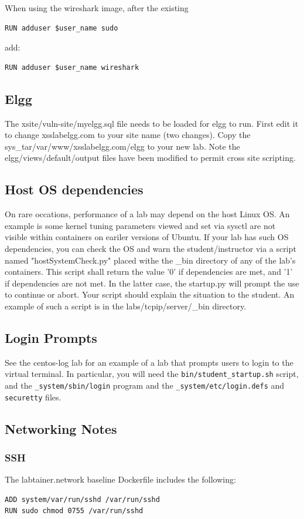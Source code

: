 \documentclass[12pt]{article}
\begin{document}
When using the wireshark image, after the existing 
\begin{verbatim}
RUN adduser $user_name sudo
\end{verbatim}

\noindent add:

\begin{verbatim}
RUN adduser $user_name wireshark
\end{verbatim}

\subsection{Elgg}
The xsite/vuln-site/myelgg.sql file needs to be loaded for elgg to run.  First edit it to
change xsslabelgg.com to your site name (two changes).  Copy the sys\_tar/var/www/xsslabelgg.com/elgg
to your new lab.  Note the elgg/views/default/output files have been modified to permit cross site scripting.
\subsection{Host OS dependencies}
On rare occations, performance of a lab may depend on the host Linux OS.  An example is some
kernel tuning parameters viewed and set via sysctl are not visible within containers on eariler versions
of Ubuntu.  If your lab has such OS dependencies, you can check the OS and warn the student/instructor via a script
named "hostSystemCheck.py" placed withe the \_bin directory of any of the lab's containers.  This script shall
return the value '0' if dependencies are met, and '1' if dependencies are not met.  In the latter case, the 
startup.py will prompt the use to continue or abort.  Your script should explain the situation to the student.
An example of such a script is in the labs/tcpip/server/\_bin directory.
\subsection{Login Prompts}
See the centos-log lab for an example of a lab that prompts users to login to the virtual terminal.
In particular, you will need the {\tt bin/student\_startup.sh} script, and the {\tt \_system/sbin/login} program and the {\tt \_system/etc/login.defs} and {\tt securetty} files.

\subsection{Networking Notes}
\label{Networking Notes}
\subsubsection{SSH}
The labtainer.network baseline Dockerfile includes the following:
\begin{verbatim}
ADD system/var/run/sshd /var/run/sshd
RUN sudo chmod 0755 /var/run/sshd
\end{verbatim}
\end{document}
